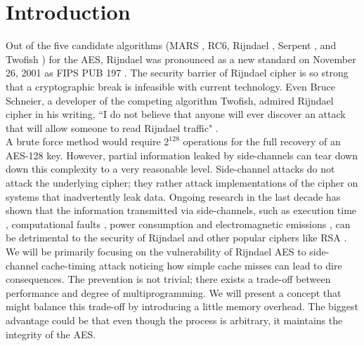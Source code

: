 \section{Introduction}

Out of the five candidate algorithms (MARS \cite{mars1998proposal}, RC6, Rijndael \cite{rijndael1998proposal}, Serpent \cite{serpent1998proposal}, and Twofish \cite{twofish1998proposal}) for the AES, Rijndael was pronounced as a new standard on November 26, 2001 as FIPS PUB 197 \cite{fips}. The security barrier of Rijndael cipher is so strong that a cryptographic break is infeasible with current technology. Even Bruce Schneier, a developer of the competing algorithm Twofish, admired Rijndael cipher in his writing, ``I do not believe that anyone will ever discover an attack that will allow someone to read Rijndael traffic" \cite{admire}.\\

A brute force method would require $2^{128}$ operations for the full recovery of an AES-128 key. However, partial information leaked by side-channels can tear down down this complexity to a very reasonable level. Side-channel attacks do not attack the underlying cipher; they rather attack implementations of the cipher on systems that inadvertently leak data. Ongoing research in the last decade has shown that the information transmitted via side-channels, such as execution time \cite{spadavecchia2006network}, computational faults \cite{boneh}, power consumption \cite{kocher} and electromagnetic emissions \cite{em, em2, scards}, can be detrimental to the security of Rijndael \cite{daemen2002design} and other popular ciphers like RSA \cite{mit}.\\

We will be primarily focusing on the vulnerability of Rijndael AES to side-channel cache-timing attack noticing how simple cache misses can lead to dire consequences. The prevention is not trivial; there exists a trade-off between performance and degree of multiprogramming. We will present a concept that might balance this trade-off by introducing a little memory overhead. The biggest advantage could be that even though the process is arbitrary, it maintains the integrity of the AES.\\
